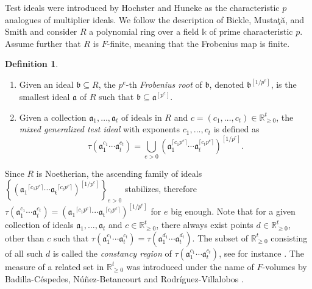 \documentclass[12pt]{amsart}
\theoremstyle{definition}
\newtheorem{definition}[theorem]{Definition}
\numberwithin{equation}{subsection}
\newcommand{\set}[1]{\left\{ #1 \right\}}
\newcommand{\RR}{\mathbb{R}}
\newcommand{\fa}{\mathfrak{a}}
\renewcommand{\!}[1]{{\color{red}\text{\Huge$\star$ }#1}}
\begin{document}
Test ideals were introduced by Hochster and Huneke \cite{HoHu90,HoHu94} as the characteristic $p$ analogues of multiplier ideals. We follow the  description of Bickle, Musta{\c{t}}{\u{a}}, and Smith \cite{BMS-MMJ} and consider $R$ a polynomial ring over a field $\mathbb{k}$ of prime characteristic $p$. Assume further that $R$ is $F$-finite, meaning that the Frobenius map is finite. 
\begin{definition}
	\begin{enumerate}
		\item Given an ideal $\mathfrak{b} \subseteq R$, the $p^{e}$-th \textit{Frobenius root} of $\mathfrak{b}$, denoted $\mathfrak{b}^{[1/p^{e}]}$, is the smallest ideal $\fa$ of $R$ such that $\mathfrak{b} \subseteq \fa^{[p^{e}]}$. 
		\item Given a collection $\mathfrak{a}_1, \ldots, \mathfrak{a}_t$ of ideals in $R$ and $c=(c_1,\ldots,c_t) \in \mathbb{R}^{t}_{\geq 0}$, the \textit{mixed generalized test ideal} with exponents $c_1,  \ldots, c_t$ is defined as
		\[
		\tau(\mathfrak{a}_1^{c_1}\cdots \fa_{t}^{c_t})= \bigcup_{e>0} (\mathfrak{a}_1^{\lceil c_1p^{e} \rceil}\cdots \mathfrak{a}_t^{\lceil c_tp^{e} \rceil})^{[1/p^{e}]}.
		\]
	\end{enumerate} 
\end{definition} 
Since $R$ is Noetherian, the ascending family of ideals $\set{(\mathfrak{a_1}^{\lceil c_1p^{e} \rceil}\cdots \mathfrak{a_t}^{\lceil c_tp^{e} \rceil})^{[1/p^{e}]}}_{e>0}$ stabilizes, therefore $\tau(\mathfrak{a}_1^{c_1}\cdots \fa_{t}^{c_t})= (\mathfrak{a_1}^{\lceil c_1p^{e} \rceil}\cdots \mathfrak{a_t}^{\lceil c_tp^{e} \rceil})^{[1/p^{e}]}$ for $e$ big enough. Note that for a given collection of ideals $\mathfrak{a}_1, \ldots, \mathfrak{a}_t$ and $c\in \RR_{\geq 0}^t$, there always exist points $d\in \RR_{\geq 0}^t$, other than $c$ such that $\tau(\mathfrak{a}_1^{c_1}\cdots \fa_{t}^{c_t})=\tau(\mathfrak{a}_1^{d_1}\cdots \fa_{t}^{d_t})$. The subset of $\RR_{\geq 0}^t$ consisting of all such $d$ is called the \textit{constancy region} of $\tau(\mathfrak{a}_1^{c_1}\cdots \fa_{t}^{c_t})$, see for instance \cite{HaYo,TakagiAdj,BMS-MMJ,Pe2013}. The measure of a related set in $\RR_{\geq 0}^t$ was introduced under the name of $F$-volumes by  Badilla-C\'{e}spedes, N\'{u}\~{n}ez-Betancourt and Rodr\'{i}guez-Villalobos \cite{BCNBRV}.
\end{document}

